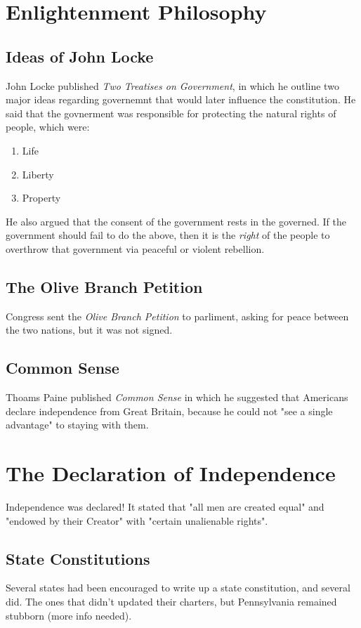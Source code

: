 \section{Enlightenment Philosophy}
\subsection{Ideas of John Locke}
John Locke published \textit{Two Treatises on Government}, in which he outline
two major ideas regarding governemnt that would later influence the
constitution.  He said that the govnerment was responsible for protecting the
natural rights of people, which were:

\begin{enumerate}
  \item Life
  \item Liberty
  \item Property
\end{enumerate}

He also argued that the consent of the government rests in the governed.  If the
government should fail to do the above, then it is the \textit{right} of the
people to overthrow that government via peaceful or violent rebellion.

\subsection{The Olive Branch Petition}
Congress sent the \textit{Olive Branch Petition} to parliment, asking for peace
between the two nations, but it was not signed.

\subsection{Common Sense}
Thoams Paine published \textit{Common Sense} in which he suggested that
Americans declare independence from Great Britain, because he could not "see a
single advantage" to staying with them.

\section{The Declaration of Independence}
Independence was declared!  It stated that "all men are created equal" and
"endowed by their Creator" with "certain unalienable rights".

\subsection{State Constitutions}
Several states had been encouraged to write up a state constitution, and several
did.  The ones that didn't updated their charters, but Pennsylvania remained
stubborn (more info needed).

